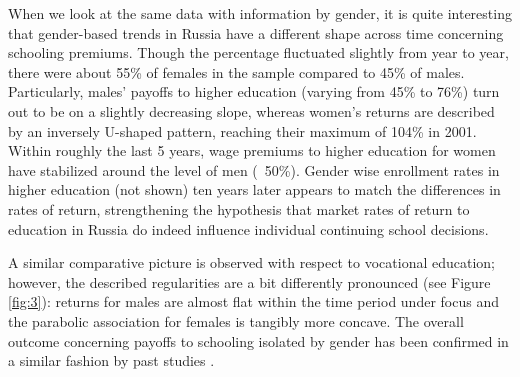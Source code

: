 \documentclass[12pt,a4paper]{article}
\numberwithin{equation}{section}
\begin{document}
When we look at the same data with information by gender, it is quite interesting that gender-based trends in Russia have a different shape across time concerning schooling premiums. Though the percentage fluctuated slightly from year to year, there were about 55\% of females in the sample compared to 45\% of males. Particularly, males' payoffs to higher education (varying from 45\% to 76\%) turn out to be on a slightly decreasing slope, whereas women's returns are described by an inversely U-shaped pattern, reaching their maximum of 104\% in 2001. Within roughly the last 5 years, wage premiums to higher education for women have stabilized around the level of men (~50\%).  Gender wise enrollment rates in higher education (not shown) ten years later appears to match the differences in rates of return, strengthening the hypothesis that market rates of return to education in Russia do indeed influence individual continuing school decisions. 

A similar comparative picture is observed with respect to vocational education; however, the described regularities are a bit differently pronounced (see Figure \ref{fig:3}): returns for males are almost flat within the time period under focus and the parabolic association for females is tangibly more concave. The overall outcome concerning payoffs to schooling isolated by gender has been confirmed in a similar fashion by past studies \parencite[e.g.,][]{cheidvasser_006._2007}.
\end{document}

